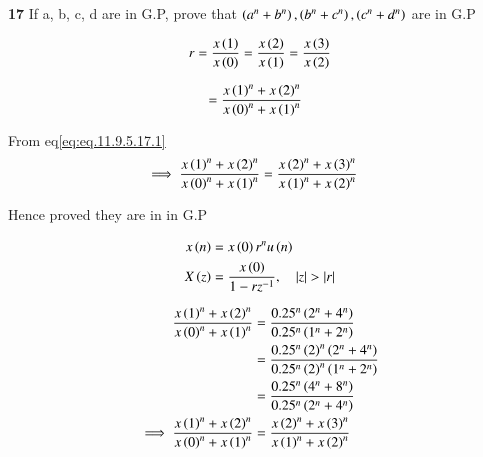 \documentclass[journal,12pt,twocolumn]{IEEEtran}
\theoremstyle{remark}
\begin{document}


\vspace{3cm}

\title{}
\author{EE23BTECH11047 - Deepakreddy P
}
\maketitle
\newpage
\bigskip

\noindent \textbf{17} \quad 
If a, b, c, d are in G.P, prove that 
$ \left(a^{n} + b^{n}\right),\left(b^{n} + c^{n}\right),\left(c^{n} + d^{n}\right) $ are in G.P \\
\solution

\begin{center}
    \begin{table}[ht]
        
    \end{table}
\end{center}


\begin{align}   
r=\frac{x\left(1\right)}{x\left(0\right)} = \frac{x\left(2\right)}{x\left(1\right)}= \frac{x\left(3\right)}{x\left(2\right)} \label{eq:eq.11.9.5.17.1}
\end{align}

\begin{align} 
   &= \frac{x\left(1\right)^n + x\left(2\right)^n }{x\left(0\right)^n + x\left(1\right)^n}
\end{align}

From eq\eqref{eq:eq.11.9.5.17.1}\\

\begin{align}
\implies \frac{x\left(1\right)^n + x\left(2\right)^n }{x\left(0\right)^n + x\left(1\right)^n} &= \frac{x\left(2\right)^n + x\left(3\right)^n}{x\left(1\right)^n + x\left(2\right)^n}
\end{align}

Hence proved they are in in G.P

\begin{align}
    x\brak{n} &= x\brak{0}r^{n} u\brak{n}\\
    X\brak{z} &= \frac{x\brak{0}}{1-rz^{-1}}, \quad |z|>|r|
\end{align}

\begin{align}
\frac{x\left(1\right)^n + x\left(2\right)^n}{x\left(0\right)^n + x\left(1\right)^n} &= \frac{0.25^n \left(2^n + 4^n\right)}{0.25^n \left(1^n + 2^n\right)}\\
&= \frac{0.25^n  \left(2\right)^n \left(2^n + 4^n\right)}{0.25^n \left(2\right)^n \left(1^n + 2^n\right)}\\
&= \frac{0.25^n \left(4^n + 8^n\right)}{0.25^n \left(2^n + 4^n\right)}\\
\implies \frac{x\left(1\right)^n + x\left(2\right)^n }{x\left(0\right)^n + x\left(1\right)^n} &= \frac{x\left(2\right)^n + x\left(3\right)^n}{x\left(1\right)^n + x\left(2\right)^n}
\end{align}
\end{document}
